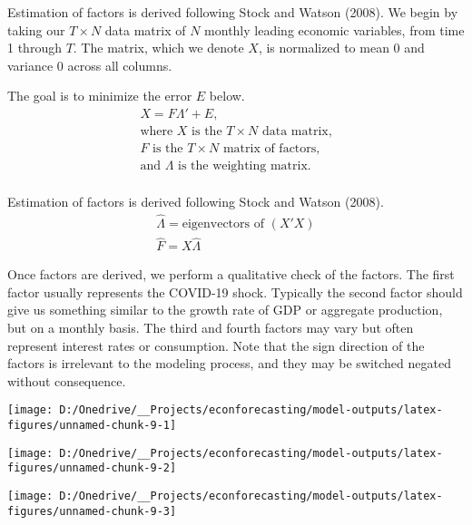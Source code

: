\documentclass[11pt, letterpaper]{article}\usepackage[]{graphicx}\usepackage[]{color}
\begin{document}
Estimation of factors is derived following Stock and Watson (2008). We begin by taking our $T \times N$ data matrix of $N$ monthly leading economic variables, from time 1 through $T$. The matrix, which we denote $X$, is normalized to mean 0 and variance 0 across all columns.

The goal is to minimize the error $E$ below.
\begin{align*}
	X = F  \Lambda ' + E,\\
	\text{where $X$ is the $T \times N$ data matrix,}\\
	\text{$F$ is the $T \times N$ matrix of factors,}\\
	\text{and $\Lambda$ is the weighting matrix.}\\
\end{align*}

Estimation of factors is derived following Stock and Watson (2008).
\begin{align*}
	\widehat{\Lambda} = \text{eigenvectors of } (X'X)\\
	\widehat{F} = X \widehat{\Lambda}
\end{align*}

Once factors are derived, we perform a qualitative check of the factors. The first factor usually represents the COVID-19 shock. Typically the second factor should give us something similar to the growth rate of GDP or aggregate production, but on a monthly basis. The third and fourth factors may vary but often represent interest rates or consumption. Note that the sign direction of the factors is irrelevant to the modeling process, and they may be switched negated without consequence. 



{\centering \texttt{[image: D:/Onedrive/\_\_Projects/econforecasting/model-outputs/latex-figures/unnamed-chunk-9-1]} 

}




{\centering \texttt{[image: D:/Onedrive/\_\_Projects/econforecasting/model-outputs/latex-figures/unnamed-chunk-9-2]} 

}




{\centering \texttt{[image: D:/Onedrive/\_\_Projects/econforecasting/model-outputs/latex-figures/unnamed-chunk-9-3]} 

}
\end{document}
